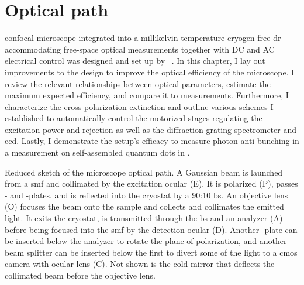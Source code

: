 \chapter{Optical path}\label{ch:setup:optics}
 confocal microscope integrated into a millikelvin-temperature cryogen-free \gls{dr} accommodating free-space optical measurements together with DC and AC electrical control was designed and set up by \citeauthor{Descamps2024}~\cite{Descamps2021,Descamps2024}.
In this chapter, I lay out improvements to the design to improve the optical efficiency of the microscope.
I review the relevant relationships between optical parameters, estimate the maximum expected efficiency, and compare it to measurements.
Furthermore, I characterize the cross-polarization extinction and outline various schemes I established to automatically control the motorized stages regulating the excitation power and rejection as well as the diffraction grating spectrometer and \gls{ccd}.
Lastly, I demonstrate the setup's efficacy to measure photon anti-bunching in a  measurement on self-assembled quantum dots in .

\begin{marginfigure}[*-8]
    
    \caption[]{
        Reduced sketch of the microscope optical path.
        A Gaussian beam is launched from a \gls{smf} and collimated by the excitation ocular (E).
        It is polarized (P), passes \halfwave- and \quarterwave-plates, and is reflected into the cryostat by a 90:10 \acrfull{bs}.
        An objective lens (O) focuses the beam onto the sample and collects and collimates the emitted light.
        It exits the cryostat, is transmitted through the \gls{bs} and an analyzer (A) before being focused into the \gls{smf} by the detection ocular (D).
        Another \halfwave-plate can be inserted below the analyzer to rotate the plane of polarization, and another beam splitter can be inserted below the first to divert some of the light to a \acrshort{cmos} camera with ocular lens (C).
        Not shown is the cold mirror that deflects the collimated beam before the objective lens.
    }
    \label{fig:setup:optics:optical_path}
\end{marginfigure}

